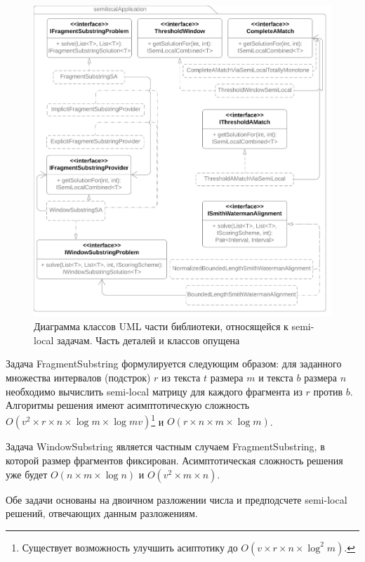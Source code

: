 \begin{figure}
    \centering
    \includegraphics[width=1.35\columnwidth,angle=90]{Mishin/figures/semiLocalApplication.png}
    \caption{Диаграмма классов UML части библиотеки, относящейся к semi-local задачам. Часть деталей и классов опущена}\label{fig:libraryApplication}
\end{figure}

Задача FragmentSubstring формулируется следующим образом: для заданного множества интервалов (подстрок) $r$ из текста $t$ размера $m$ и текста $b$ размера $n$ необходимо вычислить semi-local матрицу для каждого фрагмента из $r$ против $b$.
Алгоритмы решения имеют асимптотическую сложность $O(v^2 \times r \times  n \times \log m \times \log mv)$\footnote{Существует возможность улучшить асиптотику до $O(v \times r \times  n \times \log^{2} m)$.} и $O(r \times n \times m  \times \log m)$.

Задача WindowSubstring является частным случаем  FragmentSubstring, в которой размер фрагментов фиксирован.
Асимптотическая сложность решения уже будет $O(n \times m \times \log n)$ и $O(v^2 \times  m \times n)$.

Обе задачи основаны на двоичном разложении числа и предподсчете semi-local решений, отвечающих данным разложениям.

